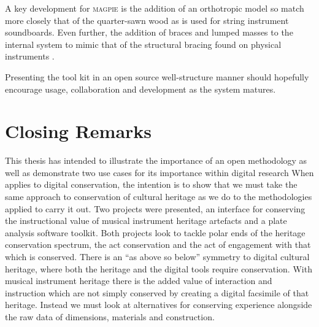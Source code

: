 A key development for \textsc{magpie} is the addition of an orthotropic model so
match more closely that of the quarter-sawn wood as is used for string
instrument soundboards. Even further, the addition of braces and lumped masses
to the internal system to mimic that of the structural bracing found on physical
instruments \cite{ducceschi_open_2024}.

Presenting the tool kit in an open source well-structure manner should hopefully
encourage usage, collaboration and development as the system matures.




\section{Closing Remarks}

This thesis has intended to illustrate the importance of an open methodology as
well as demonstrate two use cases for its importance within digital research
When applies to digital conservation, the intention is to show that we must take
the same approach to conservation of cultural heritage as we do to the
methodologies applied to carry it out. Two projects were presented, an interface
for conserving the instructional value of musical instrument heritage artefacts
and a plate analysis software toolkit. Both projects look to tackle polar ends
of the heritage conservation spectrum, the act conservation and the act of
engagement with that which is conserved. There is an ``as above so below''
symmetry to digital cultural heritage, where both the heritage and the digital
tools require conservation. With musical instrument heritage there is the added
value of interaction and instruction which are not simply conserved by creating
a digital facsimile of that heritage. Instead we must look at alternatives for
conserving experience alongside the raw data of dimensions, materials and
construction.


